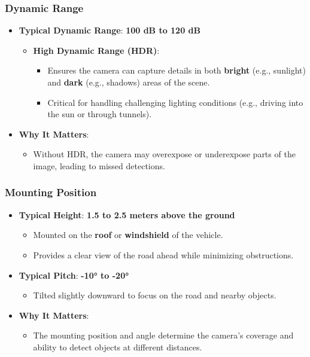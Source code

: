 \subsubsection{Dynamic Range}
\begin{itemize}
    \item \textbf{Typical Dynamic Range}: \textbf{100 dB to 120 dB}
    \begin{itemize}
        \item \textbf{High Dynamic Range (HDR)}:
        \begin{itemize}
            \item Ensures the camera can capture details in both \textbf{bright} (e.g., sunlight) and \textbf{dark} (e.g., shadows) areas of the scene.
            \item Critical for handling challenging lighting conditions (e.g., driving into the sun or through tunnels).
        \end{itemize}
    \end{itemize}
    \item \textbf{Why It Matters}:
    \begin{itemize}
        \item Without HDR, the camera may overexpose or underexpose parts of the image, leading to missed detections.
    \end{itemize}
\end{itemize}

\subsubsection{Mounting Position}
\begin{itemize}
    \item \textbf{Typical Height}: \textbf{1.5 to 2.5 meters above the ground}
    \begin{itemize}
        \item Mounted on the \textbf{roof} or \textbf{windshield} of the vehicle.
        \item Provides a clear view of the road ahead while minimizing obstructions.
    \end{itemize}
    \item \textbf{Typical Pitch}: \textbf{-10° to -20°}
    \begin{itemize}
        \item Tilted slightly downward to focus on the road and nearby objects.
    \end{itemize}
    \item \textbf{Why It Matters}:
    \begin{itemize}
        \item The mounting position and angle determine the camera's coverage and ability to detect objects at different distances.
    \end{itemize}
\end{itemize}


